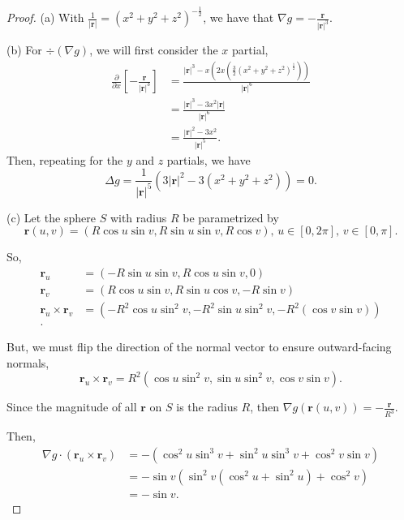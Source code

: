 \documentclass[../hw10]{subfiles}
\begin{document}
\begin{proof}
	(a) With $\frac{1}{|\mathbf{r}|}= {(x^2 + y^2 + z^2)}^{-\frac{1}{2}}$, we have that $\nabla g=- \frac{\mathbf{r}}{{|\mathbf{r}|}^3}$.

	(b) For $\div (\nabla g)$, we will first consider the $x$ partial,
	\begin{align*}
		\frac{\partial}{\partial x} \left[ - \frac{\mathbf{r}}{{|\mathbf{r}|}^3} \right] & =
		\frac{{|\mathbf{r}|}^3-x\left( 2x \left( \frac{3}{2} {(x^2 + y^2 + z^2)}^{\frac{1}{2}} \right)  \right) }{{|\mathbf{r}|}^{6}}                   \\
		                                                                                 & = \frac{{|\mathbf{r}|}^3-3x^2|\mathbf{r}|}{{|\mathbf{r}|}^6} \\
		                                                                                 & = \frac{{|\mathbf{r}|}^2-3x^2}{{|\mathbf{r}|}^5}
		.\end{align*}
	Then, repeating for the $y$ and  $z$ partials, we have \[
		\Delta g = \frac{1}{{|\mathbf{r}|}^5}(3{|\mathbf{r}|}^2- 3(x^2 + y^2 + z^2)) = 0
		.\]

	(c) Let the sphere $S$ with radius $R$ be parametrized by \[
		\mathbf{r}(u,v)=(R\cos u \sin v,R\sin u \sin v,R\cos v),\, u\in [0,2\pi],\, v\in [0,\pi]
		.\]

	So,
	\begin{align*}
		\mathbf{r}_u                     & = (-R\sin u \sin v, R\cos u \sin v, 0)                             \\
		\mathbf{r}_v                     & = (R\cos u \sin v , R \sin u \cos v , - R \sin v)                  \\
		\mathbf{r}_u \times \mathbf{r}_v & = (-R^2\cos{u}\sin^2{v},-R^2\sin{u}\sin^2{v},-R^2(\cos{v}\sin{v})) \\
		.\end{align*}

	But, we must flip the direction of the normal vector to ensure outward-facing normals,  \[
		\mathbf{r}_u\times \mathbf{r}_v = R^2(\cos{u}\sin^2{v},\sin{u}\sin^2{v},\cos{v}\sin{v})
		.\]

	Since the magnitude of all $\mathbf{r}$ on $S$ is the radius $R$, then $\nabla  g (\mathbf{r}(u,v)) = -\frac{\mathbf{r}}{R^3}$.

	Then,
	\begin{align*}
		\nabla g \cdot (\mathbf{r}_u\times \mathbf{r}_v) & =
		-(\cos^2{u}\sin^3{v} + \sin^2{u}\sin^3{v} + \cos^2{v}\sin{v})                                             \\
		                                                 & = -\sin{v}(\sin^2{v}(\cos^2{u} + \sin^2{u})+\cos^2{v}) \\
		                                                 & = -\sin{v}
		.\end{align*}


\end{proof}
\end{document}
